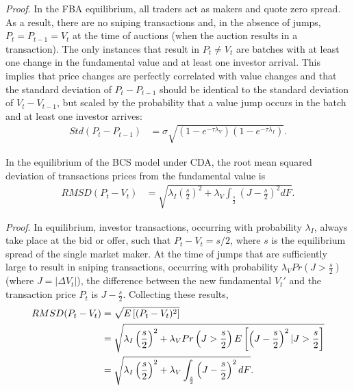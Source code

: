 \documentclass[12pt]{article}
\begin{document}
\begin{appendices}
\noindent \emph{Proof}. In the FBA equilibrium, all traders act as makers and quote zero spread. As a result, there are no sniping transactions and, in the absence of jumps, $P_t = P_{t-1} = V_t$ at the time of auctions (when the auction results in a transaction). The only instances that result in $P_t \neq V_t$ are batches with at least one change in the fundamental value and at least one investor arrival. This implies that price changes are perfectly correlated with value changes and that the standard deviation of $P_t -P_{t-1}$ should be identical to the standard deviation of $V_t-V_{t-1}$, but scaled by the probability that a value jump occurs in the batch and at least one investor arrives:
\begin{align}
Std\left(P_{t}-P_{t-1}\right) & = \sigma \sqrt{\left(1-e^{-\tau \lambda_V}\right) \left(1-e^{-\tau \lambda_I}\right)}. 
\end{align}

\begin{proposition} \label{rmsdCDA}
In the equilibrium of the BCS model under CDA, the root mean squared deviation of transactions prices from the fundamental value is
\begin{align}
RMSD(P_t-V_t) & = \sqrt{\lambda_{I}\left(\frac{s}{2}\right)^{2}+\lambda_{V}\int_{\frac{s}{2}}\left(J-\frac{s}{2}\right)^{2}dF}. \label{rmsdCDAEq}
\end{align}
\end{proposition}

\noindent \emph{Proof}. In equilibrium, investor transactions, occurring with probability $\lambda_I$, always take place at the bid or offer, such that $P_t - V_t = s/2$, where $s$ is the equilibrium spread of the single market maker. At the time of jumps that are sufficiently large to result in sniping transactions, occurring with probability $\lambda_{V}Pr\left(J>\frac{s}{2}\right)$ (where $J = |\Delta V_t|$), the difference between the new fundamental $V_t'$ and the transaction price $P_t$ is $J-\frac{s}{2}$. Collecting these results,
\begin{align}
RMSD(P_t-V_t) & = \sqrt{E\left[(P_{t}-V_{t})^{2}\right]} \nonumber \\
& = \sqrt{\lambda_{I}\left(\frac{s}{2}\right)^{2}+\lambda_{V}Pr\left(J>\frac{s}{2}\right) E\left[\left(J-\frac{s}{2}\right)^{2}\large|J>\frac{s}{2}\right] } \nonumber \\
& = \sqrt{\lambda_{I}\left(\frac{s}{2}\right)^{2}+\lambda_{V}\int_{\frac{s}{2}}\left(J-\frac{s}{2}\right)^{2}dF}.
\end{align}


\end{appendices}
\end{document}
